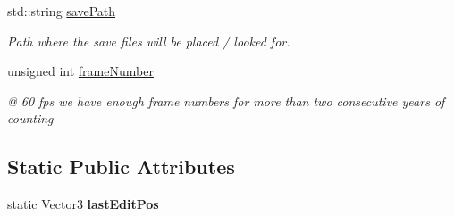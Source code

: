 \begin{DoxyCompactItemize}
\item 
\hypertarget{classGame_aa4d4fb4accaf9ba65d7ef01537cbf0de}{
std\-::string \hyperlink{classGame_aa4d4fb4accaf9ba65d7ef01537cbf0de}{save\-Path}}
\label{d9/d68/classGame_aa4d4fb4accaf9ba65d7ef01537cbf0de}

\begin{DoxyCompactList}\small\item\em \-Path where the save files will be placed / looked for. \end{DoxyCompactList}\item 
\hypertarget{classGame_aa2a210bfb05197249d58af4eac156bd9}{
unsigned int \hyperlink{classGame_aa2a210bfb05197249d58af4eac156bd9}{frame\-Number}}
\label{d9/d68/classGame_aa2a210bfb05197249d58af4eac156bd9}

\begin{DoxyCompactList}\small\item\em @ 60 fps we have enough frame numbers for more than two consecutive years of counting \end{DoxyCompactList}\end{DoxyCompactItemize}
\subsection*{\-Static \-Public \-Attributes}
\begin{DoxyCompactItemize}
\item 
\hypertarget{classGame_a19dcb13fe83c110f5084c7fe481c5be3}{
static \-Vector3 {\bfseries last\-Edit\-Pos}}
\label{d9/d68/classGame_a19dcb13fe83c110f5084c7fe481c5be3}

\end{DoxyCompactItemize}
